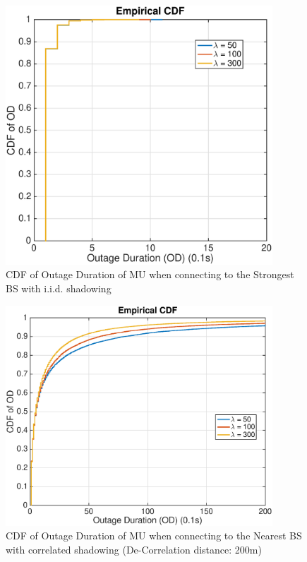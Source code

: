  \begin{figure}
 \centering
 \includegraphics[width=10cm]{ODthresh-5iidMax.eps}
 \caption{CDF of Outage Duration of MU when connecting to the Strongest BS with i.i.d. shadowing}
 \label{iid2}
 \end{figure}
 \begin{figure}
 \centering
 \includegraphics[width=10cm]{ODthresh-5DeCorr200NBMode2.eps}
 \caption{CDF of Outage Duration of MU when connecting to the Nearest BS with correlated shadowing (De-Correlation distance: 200m)}
 \label{corr1}
 \end{figure}
